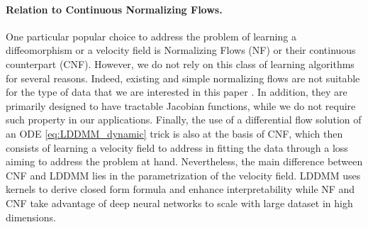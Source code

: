     
\vspace{-1ex}
\paragraph{Relation to Continuous Normalizing Flows.}

One particular popular choice to address the problem of learning a diffeomorphism or a velocity field is Normalizing Flows \cite{rezende2015variational,kobyzev2020normalizing} (NF) or their continuous counterpart \cite{chen2018neural,grathwohl2019scalable,salman2018deep} (CNF).
However, we do not rely on this class of learning algorithms for several reasons. Indeed, existing and simple normalizing flows are not suitable for the type of data that we are interested in this paper \cite{feng2023multi,deng2020modeling}. 
  In addition,  they are primarily designed to have tractable Jacobian functions, while we do not require such property in our applications. 
Finally, the use of a differential flow solution of an ODE
\eqref{eq:LDDMM_dynamic} trick is also at the basis of CNF, which
then consists of learning a velocity field to address in fitting the data through a loss aiming to address the problem
at hand. Nevertheless, the main difference between CNF and LDDMM lies in the
parametrization of the velocity field. LDDMM uses kernels to
derive closed form formula and enhance interpretability while
NF and CNF take advantage of deep neural networks to scale with
large dataset in high dimensions.
\vspace{-1ex}
